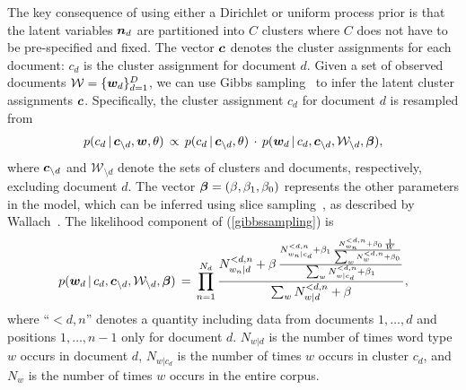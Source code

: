 \documentclass{article}
\begin{document}
The key consequence of using either a Dirichlet or uniform process
prior is that the latent variables $\boldsymbol{n}_d$ are partitioned into $C$
clusters where $C$ does not have to be pre-specified and fixed.  The
vector $\boldsymbol{c}$ denotes the cluster assignments for each document: $c_d$
is the cluster assignment for document $d$.  Given a set of observed documents
$\mathcal{W} = \{\boldsymbol{w}_d \}_{d=1}^D$, we can use Gibbs
sampling~\cite{geman84stochastic} to infer the latent cluster
assignments $\boldsymbol{c}$.  Specifically, the cluster assignment $c_d$ for
document $d$ is resampled from
\begin{eqnarray}
p(c_d \,|\, \boldsymbol{c}_{\setminus d}, \boldsymbol{w}, \theta) \, \propto \, p(c_d \,|\, \boldsymbol{c}_{\setminus d}, \theta) \, \cdot \, p(\boldsymbol{w}_d \,|\, c_d,
\boldsymbol{c}_{\setminus d}, \mathcal{W}_{\setminus d}, \boldsymbol{\beta}),\label{gibbssampling}
\end{eqnarray}
where $\boldsymbol{c}_{\setminus d}$ and $\mathcal{W}_{\setminus d}$ denote the
sets of clusters and documents, respectively, excluding document $d$.
The vector $\boldsymbol{\beta} = (\beta, \beta_1, \beta_0)$ represents the other
parameters in the model, which can be inferred using slice
sampling~\cite{neal03slice}, as described by Wallach~\cite{Wal08}. The
likelihood component of (\ref{gibbssampling}) is
\begin{eqnarray}
p(\boldsymbol{w}_d \,|\, c_d,
\boldsymbol{c}_{\setminus d}, \mathcal{W}_{\setminus d}, \boldsymbol{\beta}) \, = \, \prod_{n=1}^{N_d} \frac{N_{w_n|d}^{<d,n} + \beta\,
  \frac{N_{w_n|c_d}^{<d,n} + \beta_1\, \frac{N_{w_n}^{<d,n} + \beta_0\,
      \frac{1}{W}}{\sum_w N_w^{<d,n} + \beta_0}}{\sum_w N_{w|c_d}^{<d,n} +
    \beta_1}}{\sum_w N_{w|d}^{<d,n} + \beta},
\end{eqnarray}
where ``$< d,n$'' denotes a quantity including data from documents $1,
\ldots, d$ and positions $1, \ldots, n-1$ only for document
$d$. $N_{w|d}$ is the number of times word type $w$ occurs in document
$d$, $N_{w|c_d}$ is the number of times $w$ occurs in cluster $c_d$,
and $N_w$ is the number of times $w$ occurs in the entire corpus.
\end{document}
